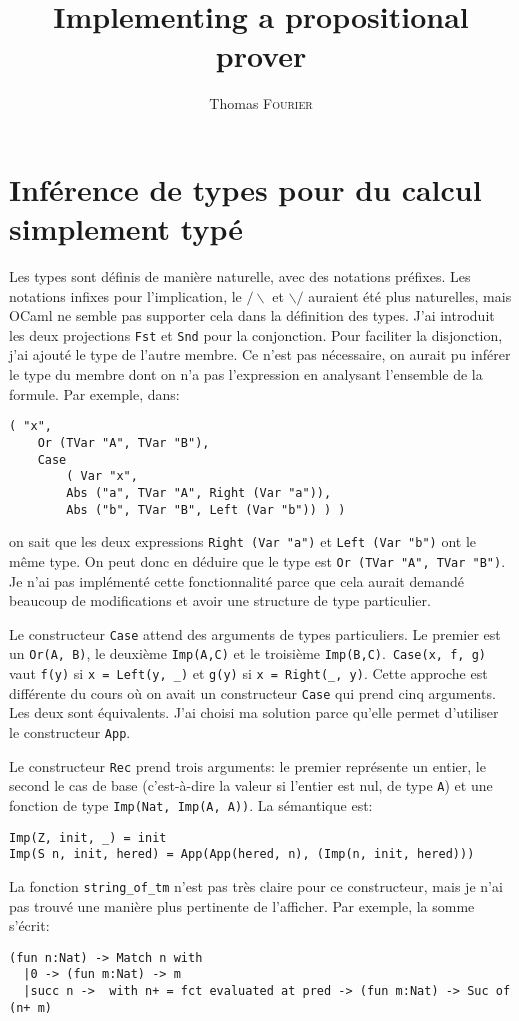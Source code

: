 \documentclass[a4paper]{article}
\author{Thomas \textsc{Fourier}}
\title{Implementing a propositional prover}
\begin{document}
    \maketitle
    \section{Inférence de types pour du calcul simplement typé}

    Les types sont définis de manière naturelle, avec des notations préfixes. Les notations infixes pour l'implication, le $/\backslash$ et $\backslash/$ auraient été plus naturelles, mais OCaml ne semble pas supporter cela dans la définition des types.
    J'ai introduit les deux projections \verb|Fst| et \verb|Snd| pour la conjonction. Pour faciliter la disjonction, j'ai ajouté le type de l'autre membre. Ce n'est pas nécessaire, on aurait pu inférer le type du membre dont on n'a pas l'expression en analysant l'ensemble de la formule. Par exemple, dans:
    \begin{verbatim}
( "x",
    Or (TVar "A", TVar "B"),
    Case
        ( Var "x",
        Abs ("a", TVar "A", Right (Var "a")),
        Abs ("b", TVar "B", Left (Var "b")) ) )
    \end{verbatim}
    on sait que les deux expressions \verb|Right (Var "a")| et \verb|Left (Var "b")| ont le même type. On peut donc en déduire que le type est \verb|Or (TVar "A", TVar "B")|. Je n'ai pas implémenté cette fonctionnalité parce que cela aurait demandé beaucoup de modifications et avoir une structure de type particulier.

    Le constructeur \verb|Case| attend des arguments de types particuliers. Le premier est un \verb|Or(A, B)|, le deuxième \verb|Imp(A,C)| et le troisième \verb|Imp(B,C)|.\ \verb|Case(x, f, g)| vaut \verb|f(y)| si \verb|x = Left(y, _)| et  \verb|g(y)| si \verb|x = Right(_, y)|. Cette approche est différente du cours où on avait un constructeur \verb|Case| qui prend cinq arguments. Les deux sont équivalents. J'ai choisi ma solution parce qu'elle permet d'utiliser le constructeur \verb|App|.

    Le constructeur \verb|Rec| prend trois arguments: le premier représente un entier, le second le cas de base (c'est-à-dire la valeur si l'entier est nul, de type \verb|A|) et une fonction de type \verb|Imp(Nat, Imp(A, A))|. La sémantique est:
    \begin{verbatim}
Imp(Z, init, _) = init
Imp(S n, init, hered) = App(App(hered, n), (Imp(n, init, hered)))
    \end{verbatim}
    La fonction \verb|string_of_tm| n'est pas très claire pour ce constructeur, mais je n'ai pas trouvé une manière plus pertinente de l'afficher. Par exemple, la somme s'écrit:
    \begin{verbatim}
(fun n:Nat) -> Match n with 
  |0 -> (fun m:Nat) -> m
  |succ n ->  with n+ = fct evaluated at pred -> (fun m:Nat) -> Suc of (n+ m)
    \end{verbatim}
\end{document}
